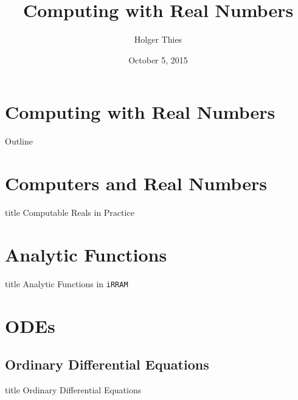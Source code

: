 \documentclass[xcolor=pdftex,dvipsnames,table]{beamer}
\title[Computing with Reals]{Computing with Real Numbers}
\author[ H. Thies]{
		Holger Thies 
}
\institute[Graco Seminar]{
  Graco Seminar
}
\newcommand{\irram}{\texttt{iRRAM}\xspace}
\begin{document}
\date{October 5, 2015}
\frame{
\titlepage
}
\section{Computing with Real Numbers}
\begin{frame}[t]{Outline}
 \tableofcontents 
\end{frame}


\section{Computers and Real Numbers}
\begin{frame}
	\begin{beamercolorbox}[sep=8pt,center,shadow=true,rounded=true]{title}
	Computable Reals in Practice\par%
    \end{beamercolorbox}
\vfill
\end{frame}

\section{Analytic Functions}
\begin{frame}
	\begin{beamercolorbox}[sep=8pt,center,shadow=true,rounded=true]{title}
	Analytic Functions in \irram \par%
    \end{beamercolorbox}
\vfill
\end{frame}



\section{ODEs}
\subsection*{Ordinary Differential Equations}
\begin{frame}
	\begin{beamercolorbox}[sep=8pt,center,shadow=true,rounded=true]{title}
	Ordinary Differential Equations\par%
    \end{beamercolorbox}
\vfill
\end{frame}

\end{document}
